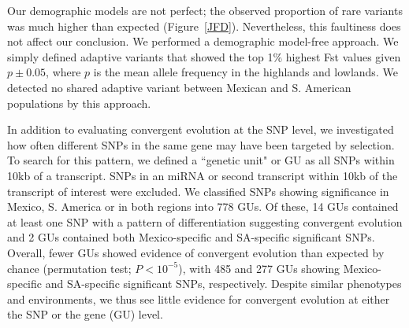 {{%

Our demographic models are not perfect; the observed proportion of rare variants was much higher than expected (Figure~\ref{JFD}).
Nevertheless, this faultiness does not affect our conclusion.
We performed a demographic model-free approach.
We simply defined adaptive variants that showed the top 1\% highest Fst values given $p\pm 0.05$, where $p$ is the mean allele frequency in the highlands and lowlands.
We detected no shared adaptive variant between Mexican and S. American populations by this approach.

In addition to evaluating convergent evolution at the SNP level, we investigated how often different SNPs in the same gene may have been targeted by selection. 
To search for this pattern, we defined a ``genetic unit" or GU as all SNPs within 10kb of a transcript.  
SNPs in an miRNA or second transcript within 10kb of the transcript of interest were excluded.  
We classified SNPs showing significance in Mexico, S. America or in both regions into 778 GUs. 
Of these, 14 GUs contained at least one SNP with a pattern of differentiation suggesting convergent evolution and 2 GUs contained both Mexico-specific and SA-specific significant SNPs. 
Overall, fewer GUs showed evidence of convergent evolution than expected by chance (permutation test; $P<10^{-5}$), with 485 and 277 GUs showing Mexico-specific and SA-specific significant SNPs, respectively.  
Despite similar phenotypes and environments, we thus see little evidence for convergent evolution at either the SNP or the gene (GU) level.  

}}
